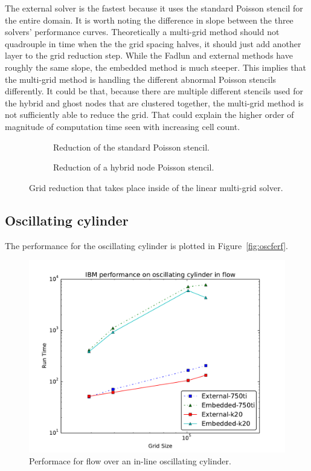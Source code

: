 The external solver is the fastest because it uses the standard Poisson stencil for the entire domain. 
It is worth noting the difference in slope between the three solvers' performance curves. 
Theoretically a multi-grid method should not quadrouple in time when the the grid spacing halves, it should just add another layer to the grid reduction step.
While the Fadlun and external methods have roughly the same slope, the embedded method is much steeper. 
This implies that the multi-grid method is handling the different abnormal Poisson stencils differently. 
It could be that, because there are multiple different stencils used for the hybrid and ghost nodes that are clustered together, the multi-grid method is not sufficiently able to reduce the grid. 
That could explain the higher order of magnitude of computation time seen with increasing cell count. 

\begin{figure}[!htb]
	\centering
	\begin{subfigure}{0.6\textwidth}
		
		\caption{Reduction of the standard Poisson stencil.}
	\end{subfigure}
	
	\begin{subfigure}{0.6\textwidth}
		
		\caption{Reduction of a hybrid node Poisson stencil.}
	\end{subfigure}
	\caption{Grid reduction that takes place inside of the linear multi-grid solver.}
	\label{fig:gridreduce}
\end{figure}

\subsection{Oscillating cylinder}

The performance for the oscillating cylinder is plotted in Figure~\ref{fig:oscferf}. 

\begin{figure}
	\centering
	\includegraphics[width=0.4\linewidth]{osc_performance}
	\caption{Performace for flow over an in-line oscillating cylinder.}
	\label{fig:oscperf}
\end{figure}






